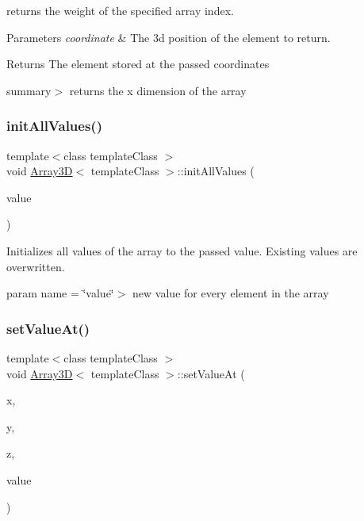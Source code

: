 returns the weight of the specified array index. 


\begin{DoxyParams}{Parameters}
{\em coordinate} & The 3d position of the element to return.\\
\hline
\end{DoxyParams}
\begin{DoxyReturn}{Returns}
The element stored at the passed coordinates
\end{DoxyReturn}
summary$>$ returns the x dimension of the array\mbox{\label{class_array3_d_a0bc535dddbd5c2e5597fc967aa0e4a0e}} 
\subsubsection{\texorpdfstring{init\+All\+Values()}{initAllValues()}}
{\footnotesize\ttfamily template$<$class template\+Class $>$ \\
void \hyperlink{class_array3_d}{Array3D}$<$ template\+Class $>$\+::init\+All\+Values (\begin{DoxyParamCaption}\item[{template\+Class}]{value }\end{DoxyParamCaption})\hspace{0.3cm}{\ttfamily [inline]}}



Initializes all values of the array to the passed value. Existing values are overwritten. 

param name = \char`\"{}value\char`\"{}$>$ new value for every element in the array \mbox{\label{class_array3_d_ab10ba3c75901c55b3d7cd2f58f6d6bde}} 
\subsubsection{\texorpdfstring{set\+Value\+At()}{setValueAt()}}
{\footnotesize\ttfamily template$<$class template\+Class $>$ \\
void \hyperlink{class_array3_d}{Array3D}$<$ template\+Class $>$\+::set\+Value\+At (\begin{DoxyParamCaption}\item[{unsigned int}]{x,  }\item[{unsigned int}]{y,  }\item[{unsigned int}]{z,  }\item[{template\+Class}]{value }\end{DoxyParamCaption})\hspace{0.3cm}{\ttfamily [inline]}}



